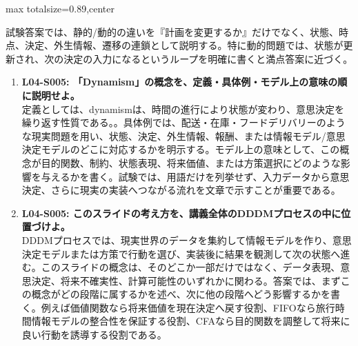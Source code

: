 \begin{minipage}[t]{0.58\textwidth}
\begin{adjustbox}{max totalsize={\textwidth}{0.89\textheight},center}
\begin{minipage}{\textwidth}
試験答案では、静的/動的の違いを『計画を変更するか』だけでなく、状態、時点、決定、外生情報、遷移の連鎖として説明する。特に動的問題では、状態が更新され、次の決定の入力になるというループを明確に書くと満点答案に近づく。\par{}\begin{enumerate}\item \textbf{L04-S005: 「Dynamism」の概念を、定義・具体例・モデル上の意味の順に説明せよ。}\\定義としては、dynamismは、時間の進行により状態が変わり、意思決定を繰り返す性質である。。具体例では、配送・在庫・フードデリバリーのような現実問題を用い、状態、決定、外生情報、報酬、または情報モデル/意思決定モデルのどこに対応するかを明示する。モデル上の意味として、この概念が目的関数、制約、状態表現、将来価値、または方策選択にどのような影響を与えるかを書く。試験では、用語だけを列挙せず、入力データから意思決定、さらに現実の実装へつながる流れを文章で示すことが重要である。\item \textbf{L04-S005: このスライドの考え方を、講義全体のDDDMプロセスの中に位置づけよ。}\\DDDMプロセスでは、現実世界のデータを集約して情報モデルを作り、意思決定モデルまたは方策で行動を選び、実装後に結果を観測して次の状態へ進む。このスライドの概念は、そのどこか一部だけではなく、データ表現、意思決定、将来不確実性、計算可能性のいずれかに関わる。答案では、まずこの概念がどの段階に属するかを述べ、次に他の段階へどう影響するかを書く。例えば価値関数なら将来価値を現在決定へ戻す役割、FIFOなら旅行時間情報モデルの整合性を保証する役割、CFAなら目的関数を調整して将来に良い行動を誘導する役割である。\end{enumerate}
\end{minipage}
\end{adjustbox}
\end{minipage}



